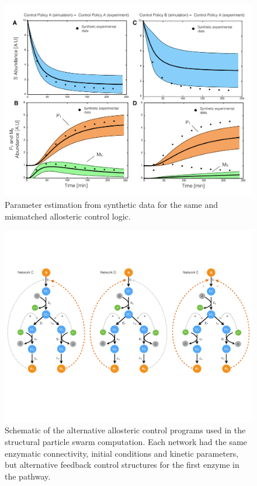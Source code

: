 \documentclass[12pt]{article}
\begin{document}
\begin{figure}
\centering
\includegraphics[width=1.0\textwidth]{./figs/Figure-5-ParameterFit.pdf}
\caption{Parameter estimation from synthetic data for the same and mismatched allosteric control logic. }\label{fig-parameter-fit}
\end{figure}

\clearpage

\begin{figure}
\centering
\includegraphics[width=1.0\textwidth]{./figs/Figure-6-AlternativeNetworks.pdf}
\caption{Schematic of the alternative allosteric control programs used in the structural particle swarm computation. 
Each network had the same enzymatic connectivity, initial conditions and kinetic parameters, but alternative feedback control structures for the first enzyme in the pathway.}\label{fig-alternative-networks}
\end{figure}
\end{document}
